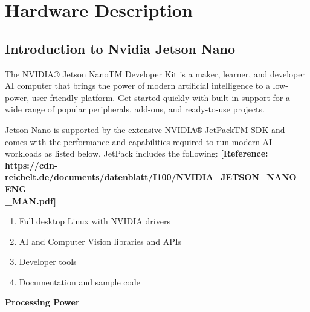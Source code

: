 %
%
%
%

\chapter{Hardware Description}
\section{Introduction to Nvidia Jetson Nano}
The NVIDIA® Jetson NanoTM Developer Kit is a maker, learner, and developer AI computer that brings the power of modern artificial intelligence to a low-power, user-friendly platform. Get started quickly with built-in support for a wide range of popular peripherals, add-ons, and ready-to-use projects.

Jetson Nano is supported by the extensive NVIDIA® JetPackTM SDK and comes with the performance and capabilities required to run modern AI workloads as listed below. JetPack includes the following: \textbf{[Reference: https://cdn-reichelt.de/documents/datenblatt/I100/NVIDIA\_JETSON\_NANO\_ENG\\\_MAN.pdf]}
\begin{enumerate}
	\item Full desktop Linux with NVIDIA drivers
	\item AI and Computer Vision libraries and APIs
	\item Developer tools
	\item Documentation and sample code
\end{enumerate}

\textbf{Processing Power}

